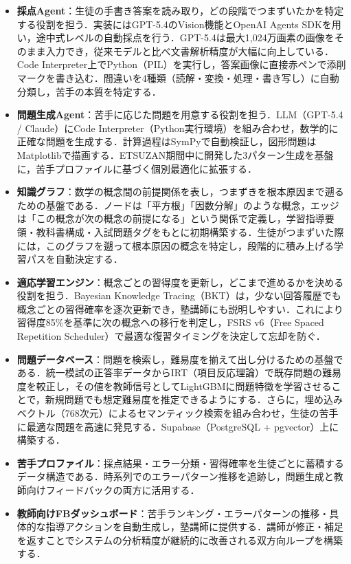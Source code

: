 \documentclass[paper=a4,fontsize=10.5bp,jafontsize=10.5bp,twocolumn]{jlreq}
\begin{document}
\begin{itemize}
  \item \textbf{採点Agent}：生徒の手書き答案を読み取り，どの段階でつまずいたかを特定する役割を担う．実装にはGPT-5.4のVision機能とOpenAI Agents SDKを用い，途中式レベルの自動採点を行う．GPT-5.4は最大1,024万画素の画像をそのまま入力でき，従来モデルと比べ文書解析精度が大幅に向上している．Code Interpreter上でPython（PIL）を実行し，答案画像に直接赤ペンで添削マークを書き込む．間違いを4種類（読解・変換・処理・書き写し）に自動分類し，苦手の本質を特定する．

  \item \textbf{問題生成Agent}：苦手に応じた問題を用意する役割を担う．LLM（GPT-5.4 / Claude）にCode Interpreter（Python実行環境）を組み合わせ，数学的に正確な問題を生成する．計算過程はSymPyで自動検証し，図形問題はMatplotlibで描画する．ETSUZAN期間中に開発した3パターン生成を基盤に，苦手プロファイルに基づく個別最適化に拡張する．

  \item \textbf{知識グラフ}：数学の概念間の前提関係を表し，つまずきを根本原因まで遡るための基盤である．ノードは「平方根」「因数分解」のような概念，エッジは「この概念が次の概念の前提になる」という関係で定義し，学習指導要領・教科書構成・入試問題タグをもとに初期構築する．生徒がつまずいた際には，このグラフを遡って根本原因の概念を特定し，段階的に積み上げる学習パスを自動決定する．

  \item \textbf{適応学習エンジン}：概念ごとの習得度を更新し，どこまで進めるかを決める役割を担う．Bayesian Knowledge Tracing（BKT）は，少ない回答履歴でも概念ごとの習得確率を逐次更新でき，塾講師にも説明しやすい．これにより習得度85\%を基準に次の概念への移行を判定し，FSRS v6（Free Spaced Repetition Scheduler）で最適な復習タイミングを決定して忘却を防ぐ．

  \item \textbf{問題データベース}：問題を検索し，難易度を揃えて出し分けるための基盤である．統一模試の正答率データからIRT（項目反応理論）で既存問題の難易度を較正し，その値を教師信号としてLightGBMに問題特徴を学習させることで，新規問題でも想定難易度を推定できるようにする．さらに，埋め込みベクトル（768次元）によるセマンティック検索を組み合わせ，生徒の苦手に最適な問題を高速に発見する．Supabase（PostgreSQL + pgvector）上に構築する．

  \item \textbf{苦手プロファイル}：採点結果・エラー分類・習得確率を生徒ごとに蓄積するデータ構造である．時系列でのエラーパターン推移を追跡し，問題生成と教師向けフィードバックの両方に活用する．

  \item \textbf{教師向けFBダッシュボード}：苦手ランキング・エラーパターンの推移・具体的な指導アクションを自動生成し，塾講師に提供する．講師が修正・補足を返すことでシステムの分析精度が継続的に改善される双方向ループを構築する．
\end{itemize}
\end{document}
